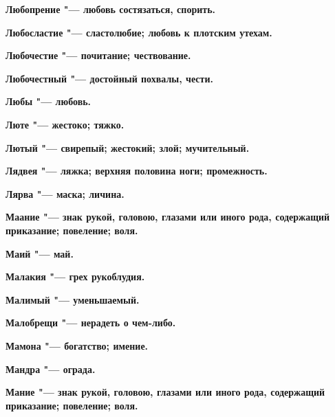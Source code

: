 \bfseries Любопрение \normalfont{} "--- любовь состязаться, спорить. 




\bfseries Любосластие \normalfont{} "--- сластолюбие; любовь к плотским утехам. 




\bfseries Любочестие \normalfont{} "--- почитание; чествование. 




\bfseries Любочестный \normalfont{} "--- достойный похвалы, чести. 




\bfseries Любы \normalfont{} "--- любовь. 




\bfseries Люте \normalfont{} "--- жестоко; тяжко. 




\bfseries Лютый \normalfont{} "--- свирепый; жестокий; злой; мучительный. 




\bfseries Лядвея \normalfont{} "--- ляжка; верхняя половина ноги; промежность. 




\bfseries Лярва \normalfont{} "--- маска; личина. 




 





\bfseries Маание \normalfont{} "--- знак рукой, головою, глазами или иного рода, содержащий приказание; повеление; воля. 




\bfseries Маий \normalfont{} "--- май. 




\bfseries Малакия \normalfont{} "--- грех рукоблудия. 




\bfseries Малимый \normalfont{} "--- уменьшаемый. 




\bfseries Малобрещи \normalfont{} "--- нерадеть о чем-либо. 




\bfseries Мамона \normalfont{} "--- богатство; имение. 




\bfseries Мандра \normalfont{} "--- ограда. 




\bfseries Мание \normalfont{} "--- знак рукой, головою, глазами или иного рода, содержащий приказание; повеление; воля. 




